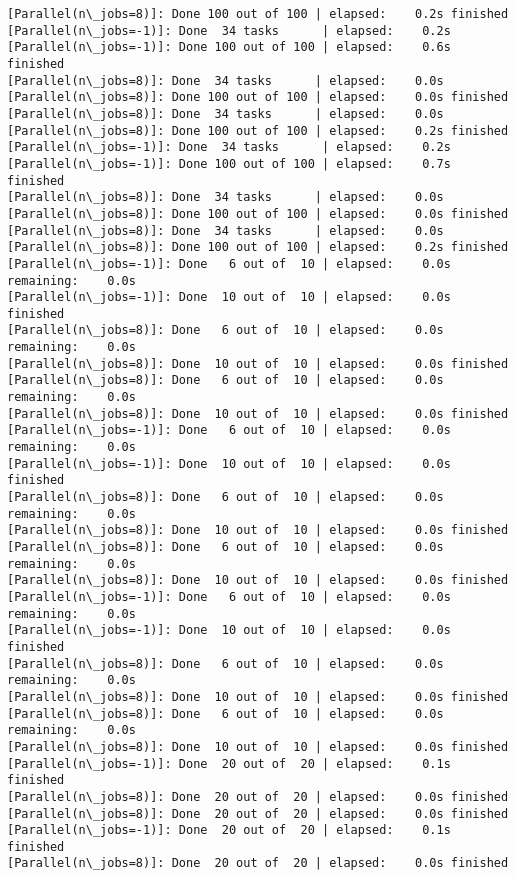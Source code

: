 \documentclass[11pt]{article}
\begin{document}
\begin{Verbatim}[commandchars=\\\{\}]
[Parallel(n\_jobs=8)]: Done 100 out of 100 | elapsed:    0.2s finished
[Parallel(n\_jobs=-1)]: Done  34 tasks      | elapsed:    0.2s
[Parallel(n\_jobs=-1)]: Done 100 out of 100 | elapsed:    0.6s finished
[Parallel(n\_jobs=8)]: Done  34 tasks      | elapsed:    0.0s
[Parallel(n\_jobs=8)]: Done 100 out of 100 | elapsed:    0.0s finished
[Parallel(n\_jobs=8)]: Done  34 tasks      | elapsed:    0.0s
[Parallel(n\_jobs=8)]: Done 100 out of 100 | elapsed:    0.2s finished
[Parallel(n\_jobs=-1)]: Done  34 tasks      | elapsed:    0.2s
[Parallel(n\_jobs=-1)]: Done 100 out of 100 | elapsed:    0.7s finished
[Parallel(n\_jobs=8)]: Done  34 tasks      | elapsed:    0.0s
[Parallel(n\_jobs=8)]: Done 100 out of 100 | elapsed:    0.0s finished
[Parallel(n\_jobs=8)]: Done  34 tasks      | elapsed:    0.0s
[Parallel(n\_jobs=8)]: Done 100 out of 100 | elapsed:    0.2s finished
[Parallel(n\_jobs=-1)]: Done   6 out of  10 | elapsed:    0.0s remaining:    0.0s
[Parallel(n\_jobs=-1)]: Done  10 out of  10 | elapsed:    0.0s finished
[Parallel(n\_jobs=8)]: Done   6 out of  10 | elapsed:    0.0s remaining:    0.0s
[Parallel(n\_jobs=8)]: Done  10 out of  10 | elapsed:    0.0s finished
[Parallel(n\_jobs=8)]: Done   6 out of  10 | elapsed:    0.0s remaining:    0.0s
[Parallel(n\_jobs=8)]: Done  10 out of  10 | elapsed:    0.0s finished
[Parallel(n\_jobs=-1)]: Done   6 out of  10 | elapsed:    0.0s remaining:    0.0s
[Parallel(n\_jobs=-1)]: Done  10 out of  10 | elapsed:    0.0s finished
[Parallel(n\_jobs=8)]: Done   6 out of  10 | elapsed:    0.0s remaining:    0.0s
[Parallel(n\_jobs=8)]: Done  10 out of  10 | elapsed:    0.0s finished
[Parallel(n\_jobs=8)]: Done   6 out of  10 | elapsed:    0.0s remaining:    0.0s
[Parallel(n\_jobs=8)]: Done  10 out of  10 | elapsed:    0.0s finished
[Parallel(n\_jobs=-1)]: Done   6 out of  10 | elapsed:    0.0s remaining:    0.0s
[Parallel(n\_jobs=-1)]: Done  10 out of  10 | elapsed:    0.0s finished
[Parallel(n\_jobs=8)]: Done   6 out of  10 | elapsed:    0.0s remaining:    0.0s
[Parallel(n\_jobs=8)]: Done  10 out of  10 | elapsed:    0.0s finished
[Parallel(n\_jobs=8)]: Done   6 out of  10 | elapsed:    0.0s remaining:    0.0s
[Parallel(n\_jobs=8)]: Done  10 out of  10 | elapsed:    0.0s finished
[Parallel(n\_jobs=-1)]: Done  20 out of  20 | elapsed:    0.1s finished
[Parallel(n\_jobs=8)]: Done  20 out of  20 | elapsed:    0.0s finished
[Parallel(n\_jobs=8)]: Done  20 out of  20 | elapsed:    0.0s finished
[Parallel(n\_jobs=-1)]: Done  20 out of  20 | elapsed:    0.1s finished
[Parallel(n\_jobs=8)]: Done  20 out of  20 | elapsed:    0.0s finished

\end{Verbatim}
\end{document}
